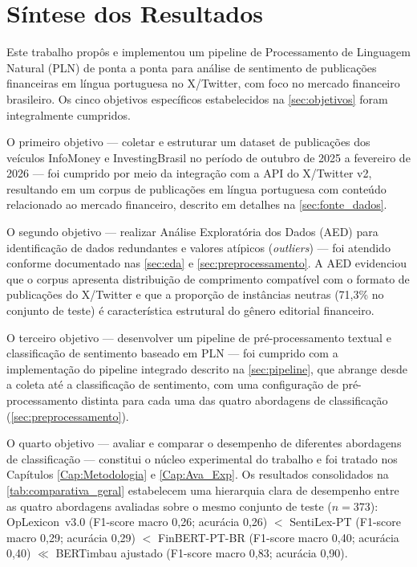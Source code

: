 
\section{Síntese dos Resultados}
\label{sec:sintese_resultados}

Este trabalho propôs e implementou um pipeline de Processamento de Linguagem Natural (PLN) de ponta a ponta para análise de sentimento de publicações financeiras em língua portuguesa no X/Twitter, com foco no mercado financeiro brasileiro. Os cinco objetivos específicos estabelecidos na \autoref{sec:objetivos} foram integralmente cumpridos.

O primeiro objetivo --- coletar e estruturar um dataset de publicações dos veículos InfoMoney e InvestingBrasil no período de outubro de 2025 a fevereiro de 2026 --- foi cumprido por meio da integração com a API do X/Twitter v2, resultando em um corpus de publicações em língua portuguesa com conteúdo relacionado ao mercado financeiro, descrito em detalhes na \autoref{sec:fonte_dados}.

O segundo objetivo --- realizar Análise Exploratória dos Dados (AED) para identificação de dados redundantes e valores atípicos (\textit{outliers}) --- foi atendido conforme documentado nas \autoref{sec:eda} e \autoref{sec:preprocessamento}. A AED evidenciou que o corpus apresenta distribuição de comprimento compatível com o formato de publicações do X/Twitter e que a proporção de instâncias neutras (71,3\% no conjunto de teste) é característica estrutural do gênero editorial financeiro.

O terceiro objetivo --- desenvolver um pipeline de pré-processamento textual e classificação de sentimento baseado em PLN --- foi cumprido com a implementação do pipeline integrado descrito na \autoref{sec:pipeline}, que abrange desde a coleta até a classificação de sentimento, com uma configuração de pré-processamento distinta para cada uma das quatro abordagens de classificação (\autoref{sec:preprocessamento}).

O quarto objetivo --- avaliar e comparar o desempenho de diferentes abordagens de classificação --- constitui o núcleo experimental do trabalho e foi tratado nos Capítulos \ref{Cap:Metodologia} e \ref{Cap:Ava_Exp}. Os resultados consolidados na \autoref{tab:comparativa_geral} estabelecem uma hierarquia clara de desempenho entre as quatro abordagens avaliadas sobre o mesmo conjunto de teste ($n = 373$): OpLexicon~v3.0 (F1-score macro 0,26; acurácia 0,26) $<$ SentiLex-PT (F1-score macro 0,29; acurácia 0,29) $<$ FinBERT-PT-BR (F1-score macro 0,40; acurácia 0,40) $\ll$ BERTimbau ajustado (F1-score macro 0,83; acurácia 0,90).

